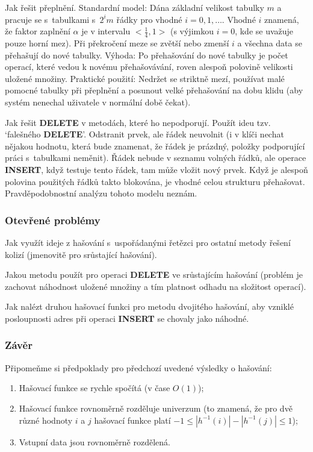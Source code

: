 \documentclass[a4paper,12pt]{article}
\begin{document}
Jak řešit přeplnění.\newline 
Standardní model: Dána základní velikost tabulky $m$ a 
pracuje se s~tabulkami s~$2^im$ řádky pro vhodné 
$i=0,1,\dots$. Vhodné $i$ znamená, že faktor zaplnění $
\alpha$ je v 
intervalu $<\frac 14,1>$ (s výjimkou $i=0$, kde se uvažuje 
pouze horní mez). Při překro\-če\-ní meze se zvětší nebo 
zmenší $i$ a všechna data se přehašují do nové 
tabulky.\newline 
Výhoda: Po přehašování do nové tabulky je počet operací, 
které vedou k novému přehašová\-vá\-ní, roven alespoň polovině 
velikosti uložené množiny.\newline 
Praktické použití: Nedržet se striktně mezí, používat 
malé pomocné ta\-bul\-ky při přeplnění a posunout velké 
přehašování na dobu klidu (aby systém nenechal uživatele v 
normální době čekat).

Jak řešit {\bf DELETE} v metodách, které ho 
nepodporují.\newline 
Použít ideu tzv. `falešného {\bf DELETE}'. 
Odstranit prvek, ale řádek neuvolnit (i v klíči nechat 
nějakou hodnotu, která bude znamenat, že řádek je 
prázdný, položky podporující práci s~tabulkami neměnit). 
Řádek nebude v seznamu volných řádků, ale 
operace {\bf INSERT}, když testuje tento řádek, tam 
může vložit nový prvek. Když je alespoň 
polovina použitých řádků takto blokována, je 
vhodné celou strukturu přehašovat. Prav\-děpodobnostní 
analýzu tohoto modelu neznám.

\subsubsection{Otevřené problémy}

Jak využít ideje z hašování s~uspořádanými 
řetězci pro ostatní metody řešení kolizí 
(jmeno\-vitě pro srůstající hašování).

Jakou metodu použít pro operaci {\bf DELETE} ve 
srůstajícím hašování (problém je zachovat náhodnost 
uložené množiny a tím platnost odhadu na složitost operací). 

Jak nalézt druhou hašovací funkci pro metodu 
dvojitého hašo\-vá\-ní, aby vzniklé posloupnosti adres při operaci 
{\bf INSERT} se chovaly jako náhodné.

\subsubsection{Závěr}

Připomeňme si předpoklady pro předchozí uvedené 
výsledky o hašování:
\begin{enumerate}
\item
Hašovací funkce se rychle spočítá (v čase 
$O(1)$);
\item Hašovací funkce rovnoměrně rozděluje univerzum (to 
znamená, že pro dvě různé hodnoty $i$ a $j$ 
hašovací funkce platí $-1\le |h^{-1}(i)|-|h^{-1}(j)|\le 
1$); 
\item
Vstupní data jsou rovnoměrně rozdělená.
\end{enumerate}
\end{document}
